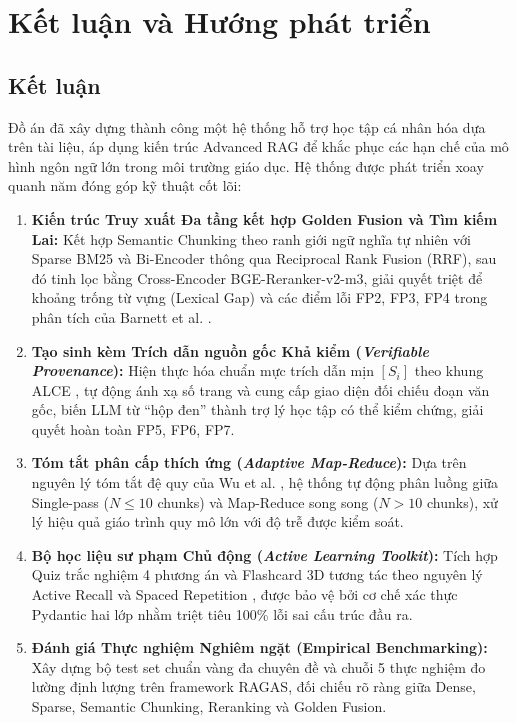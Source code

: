 ﻿\documentclass[12pt]{article}
\begin{document}
\section{Kết luận và Hướng phát triển}

\subsection{Kết luận}

Đồ án đã xây dựng thành công một hệ thống hỗ trợ học tập cá nhân hóa dựa trên tài liệu, áp dụng kiến trúc Advanced RAG để khắc phục các hạn chế của mô hình ngôn ngữ lớn trong môi trường giáo dục. Hệ thống được phát triển xoay quanh năm đóng góp kỹ thuật cốt lõi:

\begin{enumerate}
    \item \textbf{Kiến trúc Truy xuất Đa tầng kết hợp Golden Fusion và Tìm kiếm Lai:} Kết hợp Semantic Chunking theo ranh giới ngữ nghĩa tự nhiên với Sparse BM25 và Bi-Encoder thông qua Reciprocal Rank Fusion (RRF), sau đó tinh lọc bằng Cross-Encoder BGE-Reranker-v2-m3, giải quyết triệt để khoảng trống từ vựng (Lexical Gap) và các điểm lỗi FP2, FP3, FP4 trong phân tích của Barnett et al. \cite{barnett2024seven_failures}.

    \item \textbf{Tạo sinh kèm Trích dẫn nguồn gốc Khả kiểm (\textit{Verifiable Provenance}):} Hiện thực hóa chuẩn mực trích dẫn mịn $[S_i]$ theo khung ALCE \cite{gao2023alce}, tự động ánh xạ số trang và cung cấp giao diện đối chiếu đoạn văn gốc, biến LLM từ ``hộp đen'' thành trợ lý học tập có thể kiểm chứng, giải quyết hoàn toàn FP5, FP6, FP7.

    \item \textbf{Tóm tắt phân cấp thích ứng (\textit{Adaptive Map-Reduce}):} Dựa trên nguyên lý tóm tắt đệ quy của Wu et al. \cite{wu2021recursive_summarize}, hệ thống tự động phân luồng giữa Single-pass ($N \le 10$ chunks) và Map-Reduce song song ($N > 10$ chunks), xử lý hiệu quả giáo trình quy mô lớn với độ trễ được kiểm soát.

    \item \textbf{Bộ học liệu sư phạm Chủ động (\textit{Active Learning Toolkit}):} Tích hợp Quiz trắc nghiệm 4 phương án và Flashcard 3D tương tác theo nguyên lý Active Recall \cite{roediger2006testing} và Spaced Repetition \cite{kasneci2023education}, được bảo vệ bởi cơ chế xác thực Pydantic hai lớp nhằm triệt tiêu 100\% lỗi sai cấu trúc đầu ra.

    \item \textbf{Đánh giá Thực nghiệm Nghiêm ngặt (Empirical Benchmarking):} Xây dựng bộ test set chuẩn vàng đa chuyên đề và chuỗi 5 thực nghiệm đo lường định lượng trên framework RAGAS, đối chiếu rõ ràng giữa Dense, Sparse, Semantic Chunking, Reranking và Golden Fusion.
\end{enumerate}
\end{document}
